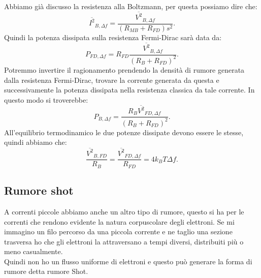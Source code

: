 Abbiamo già discusso la resistenza alla Boltzmann, per questa possiamo dire che:
\[
	\overline{I^2}_{B, \Delta f}
	= 
	\frac{\overline{V^2}_{B, \Delta f}}{\left( R_{MB}+ R_{FD} \right)s^2}
.\] 
Quindi la potenza dissipata sulla resistenza Fermi-Dirac sarà data da:
\[
	P_{FD,\Delta f}
	=
	R_{FD} 
	\frac{\overline{V^2}_{B, \Delta f}}{\left( R_B + R_{FD} \right)^2}
.\] 
Potremmo invertire il ragionamento prendendo la densità di rumore generata dalla resistenza Fermi-Dirac, trovare la corrente generata da questa e successivamente la potenza dissipata nella resistenza classica da tale corrente. In questo modo si troverebbe:
\[
	P_{B,\Delta f}
	=
	\frac{R_B \overline{V^2}_{FD,\Delta f}}{\left( R_B + R_{FD} \right)^2} 
.\] 
All'equilibrio termodinamico le due potenze dissipate devono essere le stesse, quindi abbiamo che:
\[
	\frac{\overline{V^2}_{B, FD}}{R_B} 
	= 
	\frac{\overline{V^2}_{FD,\Delta f}}{R_{FD}}
	=
	4k_B T \Delta f
.\] 
\subsection{Rumore shot}
\label{subsec:Rumore shot}
A correnti piccole abbiamo anche un altro tipo di rumore, questo si ha per le correnti che rendono evidente la natura corpuscolare degli elettroni. 
Se mi immagino un filo percorso da una piccola corrente e ne taglio una sezione trasversa ho che gli elettroni la attraversano a tempi diversi, distribuiti più o meno casualmente.\\ 
Quindi non ho un flusso uniforme di elettroni e questo può generare la forma di rumore detta rumore Shot.\\
